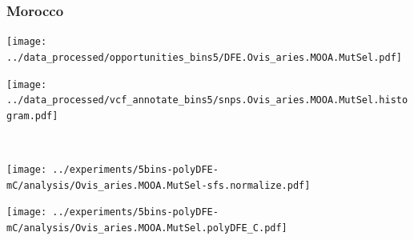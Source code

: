 \subsubsection{Morocco}

\begin{minipage}{0.49\linewidth}
    \texttt{[image: ../data\_processed/opportunities\_bins5/DFE.Ovis\_aries.MOOA.MutSel.pdf]}
\end{minipage}
\begin{minipage}{0.49\linewidth}
    \texttt{[image: ../data\_processed/vcf\_annotate\_bins5/snps.Ovis\_aries.MOOA.MutSel.histogram.pdf]}
\end{minipage}
\\
\begin{minipage}{0.49\linewidth}
    \texttt{[image: ../experiments/5bins-polyDFE-mC/analysis/Ovis\_aries.MOOA.MutSel-sfs.normalize.pdf]}
\end{minipage}
\begin{minipage}{0.49\linewidth}
    \texttt{[image: ../experiments/5bins-polyDFE-mC/analysis/Ovis\_aries.MOOA.MutSel.polyDFE\_C.pdf]}
\end{minipage}
\\
